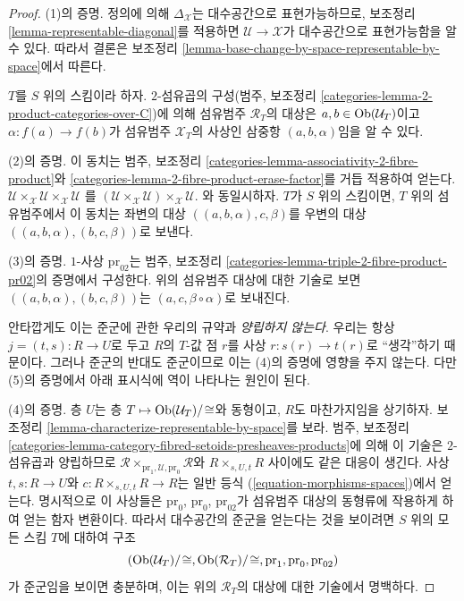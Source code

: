\begin{proof}
(1)의 증명. 정의에 의해 $\Delta_\mathcal{X}$는 대수공간으로
표현가능하므로, 보조정리 \ref{lemma-representable-diagonal}를 적용하면
$\mathcal{U} \to \mathcal{X}$가 대수공간으로 표현가능함을 알 수 있다.
따라서 결론은 보조정리
\ref{lemma-base-change-by-space-representable-by-space}에서 따른다.

\medskip\noindent
$T$를 $S$ 위의 스킴이라 하자. $2$-섬유곱의 구성(범주, 보조정리
\ref{categories-lemma-2-product-categories-over-C})에 의해 섬유범주
$\mathcal{R}_T$의 대상은 $a, b \in \mathop{\mathrm{Ob}}\nolimits(\mathcal{U}_T)$이고
$\alpha : f(a) \to f(b)$가 섬유범주 $\mathcal{X}_T$의 사상인 삼중항
$(a, b, \alpha)$임을 알 수 있다.

\medskip\noindent
(2)의 증명. 이 동치는 범주, 보조정리
\ref{categories-lemma-associativity-2-fibre-product}와
\ref{categories-lemma-2-fibre-product-erase-factor}를 거듭 적용하여 얻는다.
$\mathcal{U} \times_\mathcal{X} \mathcal{U} \times_\mathcal{X} \mathcal{U}$
를
$(\mathcal{U} \times_\mathcal{X} \mathcal{U})
\times_\mathcal{X} \mathcal{U}$.
와 동일시하자. $T$가 $S$ 위의 스킴이면, $T$ 위의 섬유범주에서 이
동치는 좌변의 대상 $((a, b, \alpha), c, \beta)$를 우변의 대상
$((a, b, \alpha), (b, c, \beta))$로 보낸다.

\medskip\noindent
(3)의 증명. $1$-사상 $\text{pr}_{02}$는 범주, 보조정리
\ref{categories-lemma-triple-2-fibre-product-pr02}의 증명에서 구성한다.
위의 섬유범주 대상에 대한 기술로 보면
$((a, b, \alpha), (b, c, \beta))$는
$(a, c, \beta \circ \alpha)$로 보내진다.

\medskip\noindent
안타깝게도 이는 준군에 관한 우리의 규약과 {\it 양립하지 않는다}.
우리는 항상 $j = (t, s) : R \to U$로 두고 $R$의 $T$-값 점 $r$를 사상
$r : s(r) \to t(r)$로 ``생각''하기 때문이다. 그러나 준군의 반대도
준군이므로 이는 (4)의 증명에 영향을 주지 않는다. 다만 (5)의 증명에서
아래 표시식에 역이 나타나는 원인이 된다.

\medskip\noindent
(4)의 증명. 층 $U$는 층
$T \mapsto \mathop{\mathrm{Ob}}\nolimits(\mathcal{U}_T)/\!\cong$와 동형이고, $R$도 마찬가지임을
상기하자. 보조정리 \ref{lemma-characterize-representable-by-space}를 보라.
범주, 보조정리
\ref{categories-lemma-category-fibred-setoids-presheaves-products}에 의해 이
기술은 $2$-섬유곱과 양립하므로
$\mathcal{R} \times_{\text{pr}_1, \mathcal{U}, \text{pr}_0} \mathcal{R}$와
$R \times_{s, U, t} R$ 사이에도 같은 대응이 생긴다. 사상
$t, s : R \to U$와 $c : R \times_{s, U, t} R \to R$는 일반 등식
(\ref{equation-morphisms-spaces})에서 얻는다. 명시적으로 이 사상들은
$\text{pr}_0$, $\text{pr}_0$, $\text{pr}_{02}$가 섬유범주 대상의
동형류에 작용하게 하여 얻는 함자 변환이다. 따라서 대수공간의 준군을
얻는다는 것을 보이려면 $S$ 위의 모든 스킴 $T$에 대하여 구조
$$
(\mathop{\mathrm{Ob}}\nolimits(\mathcal{U}_T)/\!\cong,
\mathop{\mathrm{Ob}}\nolimits(\mathcal{R}_T)/\!\cong,
\text{pr}_1, \text{pr}_0, \text{pr}_{02})
$$
가 준군임을 보이면 충분하며, 이는 위의 $\mathcal{R}_T$의 대상에 대한
기술에서 명백하다.


\end{proof}
